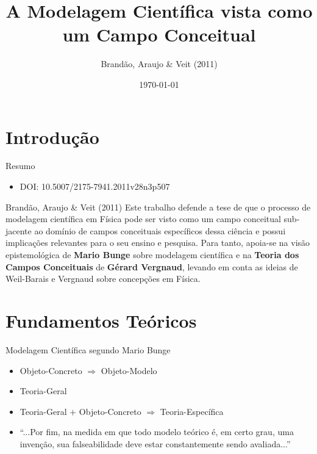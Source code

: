 \documentclass{beamer}
\title{A Modelagem Científica vista como um Campo Conceitual}
\author{Brandão, Araujo \& Veit (2011)}
\institute{Vicente Viater Figueira}
\date{\today}
\begin{document}
\frame{\titlepage}

\section{Introdução}

\begin{frame}{Resumo}
\begin{itemize}
    \item DOI: 10.5007/2175-7941.2011v28n3p507
\end{itemize}
\begin{block}{Brandão, Araujo \& Veit (2011)}
Este  trabalho  defende  a  tese  de  que  o  processo  de  modelagem  científica em  
Física  pode  ser  visto  como  um  campo  conceitual  sub-jacente  ao  domínio  de  
campos  conceituais  específicos  dessa  ciência  e  possui  implicações  relevantes  
para  o  seu  ensino  e  pesquisa.  Para tanto, apoia-se na visão epistemológica de 
\textbf{Mario Bunge} sobre modelagem científica e na \textbf{Teoria dos Campos Conceituais} de \textbf{Gérard  
Vergnaud},  levando  em  conta  as  ideias  de  Weil-Barais  e  Vergnaud sobre concepções em Física.
\end{block}
\end{frame}

\section{Fundamentos Teóricos}
\begin{frame}{Modelagem Científica segundo Mario Bunge}
\begin{itemize}
    \item Objeto-Concreto $\Rightarrow$ Objeto-Modelo
    \item Teoria-Geral
\end{itemize}
\vspace{2em}
\begin{itemize}
    \item Teoria-Geral $+$ Objeto-Concreto $\Rightarrow$ Teoria-Específica
\end{itemize}
\vspace{2em}
\begin{itemize}
    \item ``...Por fim, na medida em que todo modelo teórico é, em certo grau, 
    uma invenção, sua falseabilidade deve estar constantemente sendo avaliada...''
\end{itemize}
\end{frame}
\end{document}
